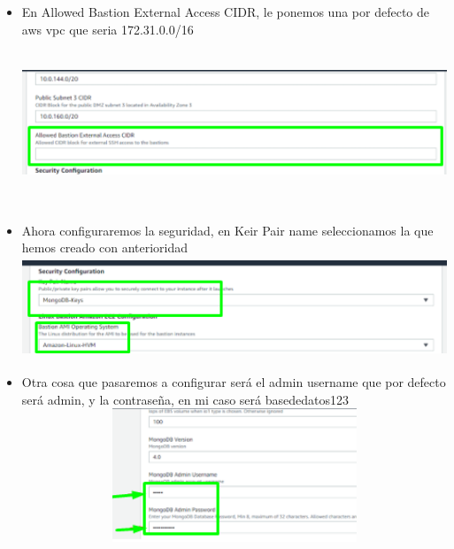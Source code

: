 \documentclass[12pt,a4paper,oneside]{book}
\begin{document}
\newpage
\begin{itemize}
	\item {En Allowed Bastion External Access CIDR, le ponemos una por defecto de aws vpc que seria 172.31.0.0/16}\\
	
	\includegraphics[width=16cm, height=5cm]{img/11.png}\\
	
	\item {Ahora configuraremos la seguridad, en Keir Pair name seleccionamos la que hemos creado con anterioridad}\\
	
	\includegraphics[width=16cm, height=3cm]{img/12.png}\\
	
	\item {Otra cosa que pasaremos a configurar será el admin username que por defecto será admin, y la contraseña, en mi caso será basededatos123}\\
	
	\includegraphics[width=16cm, height=4cm]{img/13.png}\\
	
\end{itemize}
\end{document}
